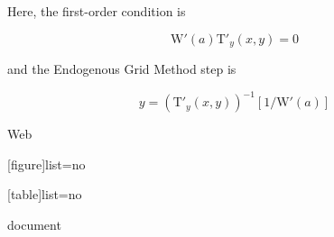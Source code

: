 \documentclass{article}
\newcommand{\aRat}{a}
\newcommand{\TFunc}{\mathrm{T}}
\newcommand{\WFunc}{\mathrm{W}}
\newcommand{\xRat}{x}
\newcommand{\yRat}{y}
\begin{document}
Here, the first-order condition is

\begin{equation}
\WFunc'(\aRat)\TFunc'_{\yRat}(\xRat,\yRat)  = 0
\end{equation}

and the Endogenous Grid Method step is

\begin{equation}
\yRat = \left(\TFunc'_{\yRat}(\xRat,\yRat)\right)^{-1} \left[ 1 / \WFunc'(\aRat)\right]
\end{equation}

Web

[figure]list=no

[table]list=no

document

\clearpage

\end{document}
